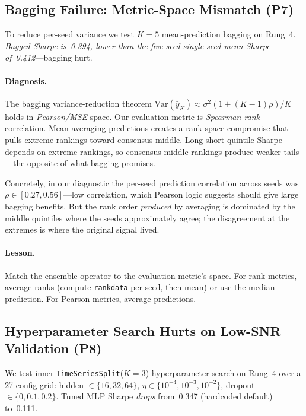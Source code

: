 \documentclass[11pt]{article}
\begin{document}
\subsection{Bagging Failure: Metric-Space Mismatch (P7)}\label{subsec:bagging-fail}

To reduce per-seed variance we test $K=5$ mean-prediction bagging on
Rung~4. \emph{Bagged Sharpe is~0.394, lower than the five-seed
single-seed mean Sharpe of~0.412}---bagging hurt.

\paragraph{Diagnosis.}
The bagging variance-reduction theorem
$\mathrm{Var}(\bar{y}_K) \approx \sigma^2(1+(K-1)\rho)/K$ holds in
\emph{Pearson/MSE} space. Our evaluation metric is \emph{Spearman rank}
correlation. Mean-averaging predictions creates a rank-space compromise
that pulls extreme rankings toward consensus middle. Long-short
quintile Sharpe depends on extreme rankings, so consensus-middle
rankings produce weaker tails---the opposite of what bagging promises.

Concretely, in our diagnostic the per-seed prediction correlation across
seeds was $\rho\in[0.27, 0.56]$---low correlation, which Pearson logic
suggests should give large bagging benefits. But the rank order
\emph{produced} by averaging is dominated by the middle quintiles where
the seeds approximately agree; the disagreement at the extremes is
where the original signal lived.

\paragraph{Lesson.}
Match the ensemble operator to the evaluation metric's space. For
rank metrics, average ranks (compute \texttt{rankdata} per seed, then
mean) or use the median prediction. For Pearson metrics, average
predictions.

\subsection{Hyperparameter Search Hurts on Low-SNR Validation (P8)}\label{subsec:hp-fail}

We test inner \texttt{TimeSeriesSplit}($K{=}3$) hyperparameter search
on Rung~4 over a 27-config grid: hidden $\in\{16,32,64\}$,
$\eta\in\{10^{-4}, 10^{-3}, 10^{-2}\}$, dropout $\in\{0, 0.1, 0.2\}$.
Tuned MLP Sharpe \emph{drops} from~0.347 (hardcoded default) to~0.111.
\end{document}
